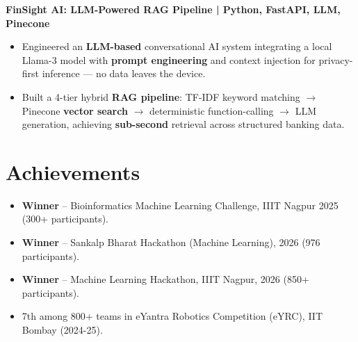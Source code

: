 \documentclass[10pt]{article}        %
\begin{document}
\textbf{FinSight AI: LLM-Powered RAG Pipeline | Python, FastAPI, LLM, Pinecone} \hfill \href{https://github.com/OmTilwar/FinSight-AI}{\faGithub} \\
\vspace{-9pt}
\begin{itemize}
  \item Engineered an \textbf{\textcolor{NavyBlue}{LLM-based}} conversational AI system integrating a local Llama-3 model with \textbf{\textcolor{NavyBlue}{prompt engineering}} and context injection for privacy-first inference — no data leaves the device.
  \item Built a 4-tier hybrid \textbf{\textcolor{NavyBlue}{RAG pipeline}}: TF-IDF keyword matching $\rightarrow$ Pinecone \textbf{\textcolor{NavyBlue}{vector search}} $\rightarrow$ deterministic function-calling $\rightarrow$ LLM generation, achieving \textbf{\textcolor{NavyBlue}{sub-second}} retrieval across structured banking data.
\end{itemize}

\vspace{-19pt}

\section*{Achievements}

\begin{itemize}
  \item \textbf{\textcolor{NavyBlue}{Winner}} -- Bioinformatics Machine Learning Challenge, IIIT Nagpur 2025 (300+ participants).
  \item \textbf{\textcolor{NavyBlue}{Winner}} -- Sankalp Bharat Hackathon (Machine Learning), 2026 (976 participants).
  \item \textbf{\textcolor{NavyBlue}{Winner}} -- Machine Learning Hackathon, IIIT Nagpur, 2026 (850+ participants).
  \item 7th among 800+ teams in eYantra Robotics Competition (eYRC), IIT Bombay (2024-25).
\end{itemize}

\vspace{-8.5pt}
\end{document}
